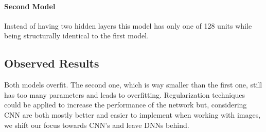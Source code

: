 \paragraph{Second Model}
Instead of having two hidden layers this model has only one of 128 units while being structurally identical to the first model.

\subsection{Observed Results}

Both models overfit. The second one, which is way smaller than the first one, still has too many parameters and leads to overfitting.
Regularization techniques could be applied to increase the performance of the network but, considering CNN are both mostly
better and easier to implement when working with images, we shift our focus towards CNN's and leave DNNs behind.
